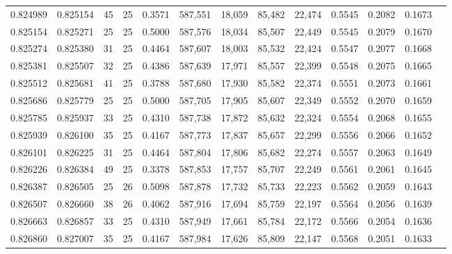 \begin{tabular}{rrrrrrrrrrrrr}
0.824989 & 0.825154 &    45 &  25 &                                     0.3571 & 587,551 &  18,059 &  85,482 &  22,474 & 0.5545 & 0.2082 & 0.1673 \\
0.825154 & 0.825271 &    25 &  25 &                                     0.5000 & 587,576 &  18,034 &  85,507 &  22,449 & 0.5545 & 0.2079 & 0.1670 \\
0.825274 & 0.825380 &    31 &  25 &                                     0.4464 & 587,607 &  18,003 &  85,532 &  22,424 & 0.5547 & 0.2077 & 0.1668 \\
0.825381 & 0.825507 &    32 &  25 &                                     0.4386 & 587,639 &  17,971 &  85,557 &  22,399 & 0.5548 & 0.2075 & 0.1665 \\
0.825512 & 0.825681 &    41 &  25 &                                     0.3788 & 587,680 &  17,930 &  85,582 &  22,374 & 0.5551 & 0.2073 & 0.1661 \\
0.825686 & 0.825779 &    25 &  25 &                                     0.5000 & 587,705 &  17,905 &  85,607 &  22,349 & 0.5552 & 0.2070 & 0.1659 \\
0.825785 & 0.825937 &    33 &  25 &                                     0.4310 & 587,738 &  17,872 &  85,632 &  22,324 & 0.5554 & 0.2068 & 0.1655 \\
0.825939 & 0.826100 &    35 &  25 &                                     0.4167 & 587,773 &  17,837 &  85,657 &  22,299 & 0.5556 & 0.2066 & 0.1652 \\
0.826101 & 0.826225 &    31 &  25 &                                     0.4464 & 587,804 &  17,806 &  85,682 &  22,274 & 0.5557 & 0.2063 & 0.1649 \\
0.826226 & 0.826384 &    49 &  25 &                                     0.3378 & 587,853 &  17,757 &  85,707 &  22,249 & 0.5561 & 0.2061 & 0.1645 \\
0.826387 & 0.826505 &    25 &  26 &                                     0.5098 & 587,878 &  17,732 &  85,733 &  22,223 & 0.5562 & 0.2059 & 0.1643 \\
0.826507 & 0.826660 &    38 &  26 &                                     0.4062 & 587,916 &  17,694 &  85,759 &  22,197 & 0.5564 & 0.2056 & 0.1639 \\
0.826663 & 0.826857 &    33 &  25 &                                     0.4310 & 587,949 &  17,661 &  85,784 &  22,172 & 0.5566 & 0.2054 & 0.1636 \\
0.826860 & 0.827007 &    35 &  25 &                                     0.4167 & 587,984 &  17,626 &  85,809 &  22,147 & 0.5568 & 0.2051 & 0.1633 \\

\end{tabular}
